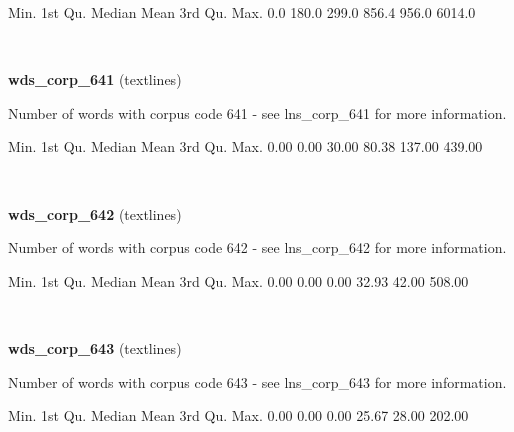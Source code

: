 \documentclass[]{article}
\newenvironment{Shaded}{\begin{snugshade}}{\end{snugshade}}
\newcommand{\FloatTok}[1]{\textcolor[rgb]{0.00,0.00,0.81}{{#1}}}
\newcommand{\NormalTok}[1]{{#1}}
\begin{document}
\begin{Shaded}
\begin{Highlighting}[]
   \NormalTok{Min. 1st Qu.  Median    Mean 3rd Qu.    Max. }
    \FloatTok{0.0}   \FloatTok{180.0}   \FloatTok{299.0}   \FloatTok{856.4}   \FloatTok{956.0}  \FloatTok{6014.0} 
\end{Highlighting}
\end{Shaded}

~

\vspace{1em}

\textbf{wds\_corp\_641} (textlines)

Number of words with corpus code 641 - see lns\_corp\_641 for more
information.

\begin{Shaded}
\begin{Highlighting}[]
   \NormalTok{Min. 1st Qu.  Median    Mean 3rd Qu.    Max. }
   \FloatTok{0.00}    \FloatTok{0.00}   \FloatTok{30.00}   \FloatTok{80.38}  \FloatTok{137.00}  \FloatTok{439.00} 
\end{Highlighting}
\end{Shaded}

~

\vspace{1em}

\textbf{wds\_corp\_642} (textlines)

Number of words with corpus code 642 - see lns\_corp\_642 for more
information.

\begin{Shaded}
\begin{Highlighting}[]
   \NormalTok{Min. 1st Qu.  Median    Mean 3rd Qu.    Max. }
   \FloatTok{0.00}    \FloatTok{0.00}    \FloatTok{0.00}   \FloatTok{32.93}   \FloatTok{42.00}  \FloatTok{508.00} 
\end{Highlighting}
\end{Shaded}

~

\vspace{1em}

\textbf{wds\_corp\_643} (textlines)

Number of words with corpus code 643 - see lns\_corp\_643 for more
information.

\begin{Shaded}
\begin{Highlighting}[]
   \NormalTok{Min. 1st Qu.  Median    Mean 3rd Qu.    Max. }
   \FloatTok{0.00}    \FloatTok{0.00}    \FloatTok{0.00}   \FloatTok{25.67}   \FloatTok{28.00}  \FloatTok{202.00} 
\end{Highlighting}
\end{Shaded}
\end{document}

